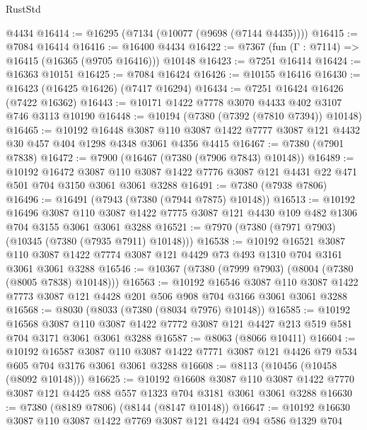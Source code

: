 \begin{lexlean}{RustStd}
\begin{coremodule}
    @4434
@16414 := @16295 (@7134 (@10077 (@9698 (@7144 @4435))))
@16415 := @7084 @16414
@16416 := @16400 @4434
@16422 := @7367 (fun (Γ : @7114) => @16415 (@16365 (@9705 @16416))) @10148
@16423 := @7251 @16414
@16424 := @16363 @10151
@16425 := @7084 @16424
@16426 := @10155 @16416
@16430 := @16423 (@16425 @16426) (@7417 @16294)
@16434 := @7251 @16424 @16426 (@7422 @16362)
@16443 := @10171 @1422 @7778 @3070 @4433 @402 @3107 @746 @3113 @10190
@16448 := @10194 (@7380 (@7392 (@7810 @7394)) @10148)
@16465 := @10192
    @16448
    @3087
    @110
    @3087
    @1422
    @7777
    @3087
    @121
    @4432
    @30
    @457
    @404
    @1298
    @4348
    @3061
    @4356
    @4415
@16467 := @7380 (@7901 @7838)
@16472 := @7900 (@16467 (@7380 (@7906 @7843) @10148))
@16489 := @10192
    @16472
    @3087
    @110
    @3087
    @1422
    @7776
    @3087
    @121
    @4431
    @22
    @471
    @501
    @704
    @3150
    @3061
    @3061
    @3288
@16491 := @7380 (@7938 @7806)
@16496 := @16491 (@7943 (@7380 (@7944 @7875) @10148))
@16513 := @10192
    @16496
    @3087
    @110
    @3087
    @1422
    @7775
    @3087
    @121
    @4430
    @109
    @482
    @1306
    @704
    @3155
    @3061
    @3061
    @3288
@16521 := @7970 (@7380 (@7971 @7903) (@10345 (@7380 (@7935 @7911) @10148)))
@16538 := @10192
    @16521
    @3087
    @110
    @3087
    @1422
    @7774
    @3087
    @121
    @4429
    @73
    @493
    @1310
    @704
    @3161
    @3061
    @3061
    @3288
@16546 := @10367 (@7380 (@7999 @7903) (@8004 (@7380 (@8005 @7838) @10148)))
@16563 := @10192
    @16546
    @3087
    @110
    @3087
    @1422
    @7773
    @3087
    @121
    @4428
    @201
    @506
    @908
    @704
    @3166
    @3061
    @3061
    @3288
@16568 := @8030 (@8033 (@7380 (@8034 @7976) @10148))
@16585 := @10192
    @16568
    @3087
    @110
    @3087
    @1422
    @7772
    @3087
    @121
    @4427
    @213
    @519
    @581
    @704
    @3171
    @3061
    @3061
    @3288
@16587 := @8063 (@8066 @10411)
@16604 := @10192
    @16587
    @3087
    @110
    @3087
    @1422
    @7771
    @3087
    @121
    @4426
    @79
    @534
    @605
    @704
    @3176
    @3061
    @3061
    @3288
@16608 := @8113 (@10456 (@10458 (@8092 @10148)))
@16625 := @10192
    @16608
    @3087
    @110
    @3087
    @1422
    @7770
    @3087
    @121
    @4425
    @88
    @557
    @1323
    @704
    @3181
    @3061
    @3061
    @3288
@16630 := @7380 (@8189 @7806) (@8144 (@8147 @10148))
@16647 := @10192
    @16630
    @3087
    @110
    @3087
    @1422
    @7769
    @3087
    @121
    @4424
    @94
    @586
    @1329
    @704

\end{coremodule}
\end{lexlean}
